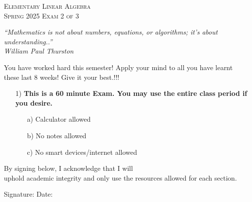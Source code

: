 \documentclass[12pt]{article}%
\begin{document}
\newcommand{\HRule}{\rule{\linewidth}{0.5mm}}

\begin{minipage}{0.8\textwidth}
\begin{flushright}
\centering
\textsc{\small Elementary Linear Algebra}\\[0.1cm] 
\textsc{\small Spring 2025 Exam 2 of 3
}\\[0.1cm] 
\end{flushright}
\end{minipage}

\vspace{1cm}
\begin{center}
    \textit{“Mathematics is not about numbers, equations, or algorithms; it's about understanding..”}
\\
\textit{William Paul Thurston }

\end{center}

\begin{center}
    You have worked hard this semester! Apply your mind to all you have learnt these last 8 weeks! Give it your best.!!!
\end{center}
\vspace{2cm}
\begin{enumerate}
    \item[1)] \textbf{This is a 60 minute Exam. You may use the entire class period if you desire.}
    \begin{itemize}
        \item[a)] Calculator allowed

        \item[b)] No notes allowed
        
        \item[c)] No smart devices/internet allowed
    \end{itemize}
    
\end{enumerate}
\vspace{1cm}
By signing below, I \hrulefill \hspace{0.2cm} acknowledge that I will\\
uphold academic integrity and only use the resources allowed for each section.

\vspace{1cm}
Signature:\hrulefill \hspace{2cm} Date:\hrulefill

\vspace{0.5cm}
\end{document}
